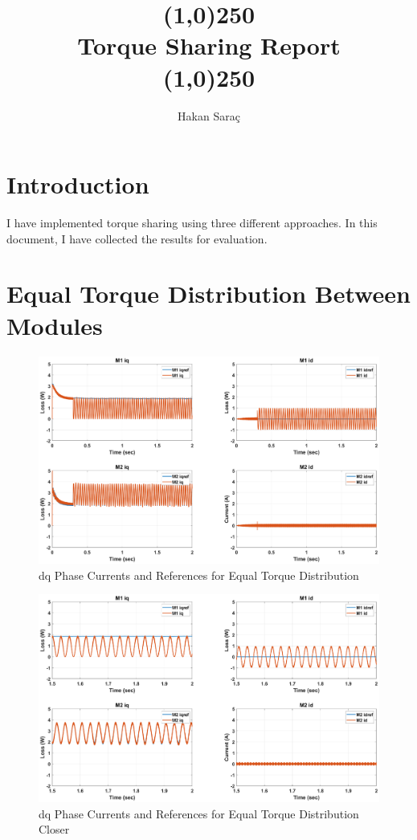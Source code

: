 \documentclass{article}
\author{\hisfont Hakan Saraç}
\date{}
\begin{document}
\title{\line(1,0){250}\\\myfont Torque Sharing Report\\\line(1,0){250}}
\maketitle
\newpage
\tableofcontents
\newpage


\section{Introduction}
I have implemented torque sharing using three different approaches. In this document, I have collected the results for evaluation.


\section{Equal Torque Distribution Between Modules}
\begin{figure}[H]
\centering
\includegraphics[scale=0.35]{SimulationResults/EqualTorqueShare/idq_refs.eps}
\caption{dq Phase Currents and References for Equal Torque Distribution}
\label{fig:PhaseCurrentsReferencesEqual}
\end{figure}

\begin{figure}[H]
\centering
\includegraphics[scale=0.35]{SimulationResults/EqualTorqueShare/idq_refs_closer.eps}
\caption{dq Phase Currents and References for Equal Torque Distribution Closer}
\label{fig:PhaseCurrentsReferencesEqualCloser}
\end{figure}
\end{document}
